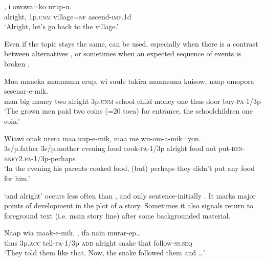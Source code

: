 \ea%
\label{ex:3:x720}
\gll {}, i owowa=ko urup-u. \\
alright, 1p.\textsc{unm} village=\textsc{nf} ascend-\textsc{imp}.1d\\
\glt`Alright, let's go back to the village.'
\z

Even if the topic stays the same,  can be used, especially when there is a contrast between alternatives , or sometimes when an expected sequence of events is broken .

\ea%
\label{ex:3:x719}
\gll Mua maneka maamuma erup,  wi suule takira maamuma kuisow, naap omopora sesenar-e-mik.\\
man big money two alright 3p.\textsc{unm} school child money one thus door buy-\textsc{pa}-1/3p\\
\glt`The grown men paid two coins (=20 toea) for entrance, the schoolchildren one coin.'
\z

\ea%
\label{ex:3:x722}
\gll Wiawi onak urera maa uup-e-mik,  maa me wu-om-a-mik=yon.\\
3s/p.father 3s/p.mother evening food cook-\textsc{pa}-1/3p alright food not put-\textsc{ben}-\textsc{bnfy}2.\textsc{pa}-1/3p-perhaps\\
\glt`In the evening his parents cooked food, (but) perhaps they didn't put any food for him.'
\z

 `and alright' occurs less often than , and only sentence-initially  . It marks major points of development in the plot of a story. Sometimes it also signals return to foreground text (i.e. main story line) after some backgrounded material. 

\ea%
\label{ex:3:x723}
\gll Naap wia maak-e-mik.  , ifa nain murar-ep{\dots} \\
thus 3p.\textsc{acc} tell-\textsc{pa}-1/3p \textsc{add} alright snake that follow-\textsc{ss}.\textsc{seq}\\
\glt`They told them like that. Now, the snake followed them and {\dots}'
\z

